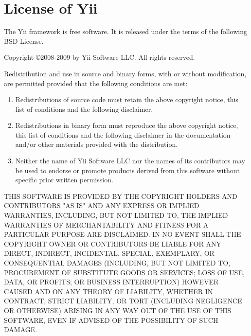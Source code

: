 \chapter*{License of Yii}

The Yii framework is free software.
It is released under the terms of the following BSD License.

Copyright \copyright 2008-2009 by Yii Software LLC.
All rights reserved.

Redistribution and use in source and binary forms, with or without
modification, are permitted provided that the following conditions
are met:
\begin{enumerate}
\item Redistributions of source code must retain the above copyright
      notice, this list of conditions and the following disclaimer.
\item Redistributions in binary form must reproduce the above
      copyright notice, this list of conditions and the following
      disclaimer in the documentation and/or other materials provided
	  with the distribution.
\item Neither the name of Yii Software LLC nor the names of its
      contributors may be used to endorse or promote products derived
	  from this software without specific prior written permission.
\end{enumerate}

{\footnotesize
THIS SOFTWARE IS PROVIDED BY THE COPYRIGHT HOLDERS AND CONTRIBUTORS "AS IS"
AND ANY EXPRESS OR IMPLIED WARRANTIES, INCLUDING, BUT NOT LIMITED TO, THE
IMPLIED WARRANTIES OF MERCHANTABILITY AND FITNESS FOR A PARTICULAR PURPOSE
ARE DISCLAIMED. IN NO EVENT SHALL THE COPYRIGHT OWNER OR CONTRIBUTORS BE
LIABLE FOR ANY DIRECT, INDIRECT, INCIDENTAL, SPECIAL, EXEMPLARY, OR
CONSEQUENTIAL DAMAGES (INCLUDING, BUT NOT LIMITED TO, PROCUREMENT OF
SUBSTITUTE GOODS OR SERVICES; LOSS OF USE, DATA, OR PROFITS; OR BUSINESS
INTERRUPTION) HOWEVER CAUSED AND ON ANY THEORY OF LIABILITY, WHETHER IN
CONTRACT, STRICT LIABILITY, OR TORT (INCLUDING NEGLIGENCE OR OTHERWISE)
ARISING IN ANY WAY OUT OF THE USE OF THIS SOFTWARE, EVEN IF ADVISED OF THE
POSSIBILITY OF SUCH DAMAGE.
}